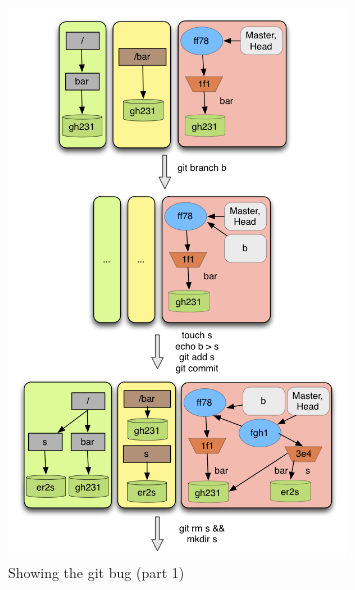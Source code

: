 \begin{figure}[tp]
   \centering
   \includegraphics[width=0.8\textwidth]{images/gitbug1.png}
   \caption{Showing the git bug (part 1)}\label{fig:gitbug1}
\end{figure}
